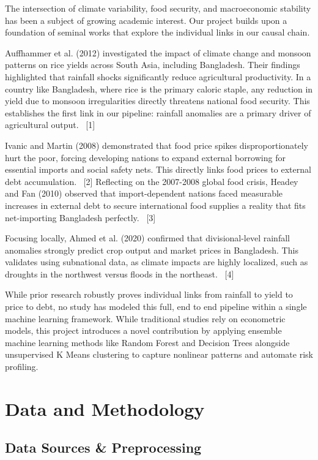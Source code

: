 \documentclass[12pt,a4paper]{article}
\begin{document}
The intersection of climate variability, food security, and macroeconomic stability has been a subject of growing academic interest. Our project builds upon a foundation of seminal works that explore the individual links in our causal chain.

Auffhammer et al. (2012) investigated the impact of climate change and monsoon patterns on rice yields across South Asia, including Bangladesh. Their findings highlighted that rainfall shocks significantly reduce agricultural productivity. In a country like Bangladesh, where rice is the primary caloric staple, any reduction in yield due to monsoon irregularities directly threatens national food security. This establishes the first link in our pipeline: rainfall anomalies are a primary driver of agricultural output. ~[1]

Ivanic and Martin (2008) demonstrated that food price spikes disproportionately hurt the poor, forcing developing nations to expand external borrowing for essential imports and social safety nets. This directly links food prices to external debt accumulation. ~[2] Reflecting on the 2007-2008 global food crisis, Headey and Fan (2010) observed that import-dependent nations faced measurable increases in external debt to secure international food supplies a reality that fits net-importing Bangladesh perfectly. ~[3]

Focusing locally, Ahmed et al. (2020) confirmed that divisional-level rainfall anomalies strongly predict crop output and market prices in Bangladesh. This validates using subnational data, as climate impacts are highly localized, such as droughts in the northwest versus floods in the northeast. ~[4]

While prior research robustly proves individual links from rainfall to yield to price to debt, no study has modeled this full, end to end pipeline within a single machine learning framework. While traditional studies rely on econometric models, this project introduces a novel contribution by applying ensemble machine learning methods like Random Forest and Decision Trees alongside unsupervised K Means clustering to capture nonlinear patterns and automate risk profiling.



\clearpage
\section{Data and Methodology}
\subsection{Data Sources \& Preprocessing}
\end{document}
